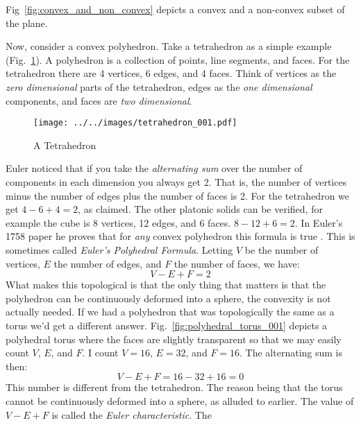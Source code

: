     Fig~\ref{fig:convex_and_non_convex} depicts a convex and a non-convex
    subset of the plane.
    \par\hfill\par
    Now, consider a convex polyhedron. Take a tetrahedron as a simple
    example (Fig.~\ref{fig:tetrahedron_001}). A polyhedron is a collection of
    points, line segments, and faces. For the tetrahedron there are 4 vertices,
    6 edges, and 4 faces. Think of vertices as the
    \textit{zero dimensional} parts of the tetrahedron, edges as the
    \textit{one dimensional} components, and faces are \textit{two dimensional}.
    \begin{figure}[H]
        \centering
        \texttt{[image: ../../images/tetrahedron\_001.pdf]}
        \caption{A Tetrahedron}
        \label{fig:tetrahedron_001}
    \end{figure}
    Euler noticed that if you take the \textit{alternating sum} over the number
    of components in each dimension you always get 2. That is, the number of
    vertices minus the number of edges plus the number of faces is 2. For the
    tetrahedron we get $4-6+4=2$, as claimed. The other platonic solids can be
    verified, for example the cube is 8 vertices, 12 edges, and 6 faces.
    $8-12+6=2$. In Euler's 1758 paper he proves that for \textit{any} convex
    polyhedron this formula is true \cite{LeonhardEulerPolyhedraFormula}. This
    is sometimes called \textit{Euler's Polyhedral Formula}. Letting $V$ be the
    number of vertices, $E$ the number of edges, and $F$ the number of faces,
    we have:
    \begin{equation}
        V-E+F=2
    \end{equation}
    What makes this topological is that the only thing that matters is that the
    polyhedron can be continuously deformed into a sphere, the convexity is not
    actually needed. If we had a polyhedron that was topologically the same as
    a torus we'd get a different answer.
    Fig.~\ref{fig:polyhedral_torus_001} depicts a polyhedral torus where the
    faces are slightly transparent so that we may easily count $V$, $E$, and
    $F$. I count $V=16$, $E=32$, and $F=16$. The alternating sum is then:
    \begin{equation}
        V-E+F=16-32+16=0
    \end{equation}
    This number is different from the tetrahedron. The reason being that the
    torus cannot be continuously deformed into a sphere, as alluded to earlier.
    The value of $V-E+F$ is called the \textit{Euler characteristic}. The
